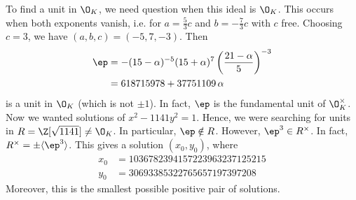 \begin{ex}
\[	\]
To find a unit in $\O_K$, we need question when this ideal is $\O_K$. This occurs when both exponents vanish, i.e. for $a=\frac{5}{3}c$ and $b= -\frac{7}{3}c$ with $c$ free. Choosing $c=3$, we have $(a,b,c)=(-5,7,-3)$. Then
	\[
	\begin{split}
	\ep&= -(15-\alpha)^{-5} (15+\alpha)^7 \left(\dfrac{21-\alpha}{5}\right)^{-3} \\
	&= 618715978 + 37751109 \,\alpha %
	\end{split}
	\]
is a unit in $\O_K$ (which is not $\pm1$). In fact, $\ep$ is the fundamental unit of $\O_K^\times$. Now we wanted solutions of $x^2-1141y^2=1$. Hence, we were searching for units in $R=\Z[\sqrt{1141}] \neq \O_K$. In particular, $\ep \notin R$. However, $\ep^3 \in R^\times$. In fact, $R^\times = \pm \langle \ep^3 \rangle$. This gives a solution $(x_0,y_0)$, where
	\[
	\begin{split}
	x_0&= 1036782394157223963237125215 \\
	y_0&=30693385322765657197397208
	\end{split}
	\]
Moreover, this is the smallest possible positive pair of solutions. \xqed
\end{ex}
